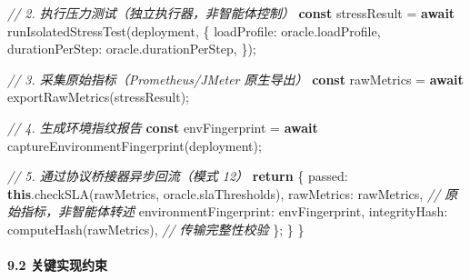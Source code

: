 \documentclass[
]{ctexart}
\newenvironment{Shaded}{}{}
\newcommand{\AttributeTok}[1]{\textcolor[rgb]{0.49,0.56,0.16}{#1}}
\newcommand{\CommentTok}[1]{\textcolor[rgb]{0.38,0.63,0.69}{\textit{#1}}}
\newcommand{\ControlFlowTok}[1]{\textcolor[rgb]{0.00,0.44,0.13}{\textbf{#1}}}
\newcommand{\FunctionTok}[1]{\textcolor[rgb]{0.02,0.16,0.49}{#1}}
\newcommand{\KeywordTok}[1]{\textcolor[rgb]{0.00,0.44,0.13}{\textbf{#1}}}
\newcommand{\NormalTok}[1]{#1}
\newcommand{\OperatorTok}[1]{\textcolor[rgb]{0.40,0.40,0.40}{#1}}
\renewcommand{\_}{\discretionary{}{}{\textunderscore}}
\begin{document}
\begin{Shaded}
\begin{Highlighting}[]
    \CommentTok{// 2. 执行压力测试（独立执行器，非智能体控制）}
    \KeywordTok{const}\NormalTok{ stressResult }\OperatorTok{=} \ControlFlowTok{await} \FunctionTok{runIsolatedStressTest}\NormalTok{(deployment}\OperatorTok{,}\NormalTok{ \{}
\NormalTok{      loadProfile}\OperatorTok{:}\NormalTok{ oracle}\OperatorTok{.}\AttributeTok{loadProfile}\OperatorTok{,}
\NormalTok{      durationPerStep}\OperatorTok{:}\NormalTok{ oracle}\OperatorTok{.}\AttributeTok{durationPerStep}\OperatorTok{,}
\NormalTok{    \})}\OperatorTok{;}

    \CommentTok{// 3. 采集原始指标（Prometheus/JMeter 原生导出）}
    \KeywordTok{const}\NormalTok{ rawMetrics }\OperatorTok{=} \ControlFlowTok{await} \FunctionTok{exportRawMetrics}\NormalTok{(stressResult)}\OperatorTok{;}

    \CommentTok{// 4. 生成环境指纹报告}
    \KeywordTok{const}\NormalTok{ envFingerprint }\OperatorTok{=} \ControlFlowTok{await} \FunctionTok{captureEnvironmentFingerprint}\NormalTok{(deployment)}\OperatorTok{;}

    \CommentTok{// 5. 通过协议桥接器异步回流（模式 12）}
    \ControlFlowTok{return}\NormalTok{ \{}
\NormalTok{      passed}\OperatorTok{:} \KeywordTok{this}\OperatorTok{.}\FunctionTok{checkSLA}\NormalTok{(rawMetrics}\OperatorTok{,}\NormalTok{ oracle}\OperatorTok{.}\AttributeTok{slaThresholds}\NormalTok{)}\OperatorTok{,}
\NormalTok{      rawMetrics}\OperatorTok{:}\NormalTok{ rawMetrics}\OperatorTok{,}           \CommentTok{// 原始指标，非智能体转述}
\NormalTok{      environmentFingerprint}\OperatorTok{:}\NormalTok{ envFingerprint}\OperatorTok{,}
\NormalTok{      integrityHash}\OperatorTok{:} \FunctionTok{computeHash}\NormalTok{(rawMetrics)}\OperatorTok{,}  \CommentTok{// 传输完整性校验}
\NormalTok{    \}}\OperatorTok{;}
\NormalTok{  \}}
\NormalTok{\}}
\end{Highlighting}
\end{Shaded}

\paragraph{9.2 关键实现约束}\label{ux5173ux952eux5b9eux73b0ux7ea6ux675f}
\end{document}
